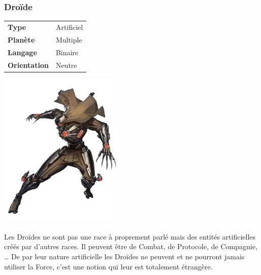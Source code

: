 \subsubsection{Droïde}
\begin{samepage}
	\vspace{4\baselineskip}
	\begin{tabular}{ l l }
		\textbf{Type} 			& Artificiel \\
	   	\textbf{Planète} 		& Multiple \\
	   	\textbf{Langage} 		& Binaire \\
	   	\textbf{Orientation} 	& Neutre \\
	\end{tabular}

	\vspace{-11\baselineskip}

	\begin{flushright}
		\includegraphics[width=6cm]{img/personnages/races/droide.png}
	\end{flushright}
	\vspace{-2\baselineskip}
\end{samepage}

Les Droïdes ne sont pas une race à proprement parlé mais des entités artificielles créés par d’autres races. Il peuvent être de Combat, de Protocole, de Compagnie, \ldots 
De par leur nature artificielle les Droïdes ne peuvent et ne pourront jamais utiliser la Force, c’est une notion qui leur est totalement étrangère.

